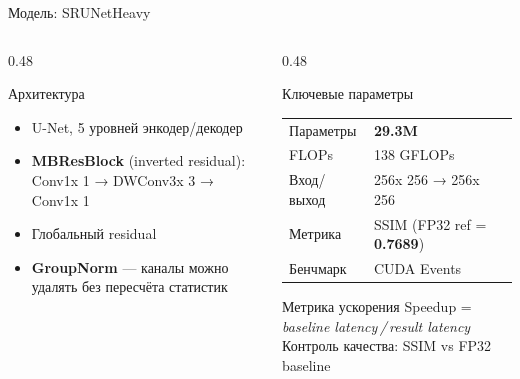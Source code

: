 \documentclass[aspectratio=169,11pt]{beamer}
\begin{document}
\begin{frame}{Модель: SRUNetHeavy}
  \begin{columns}[T]
    \begin{column}{0.48\textwidth}
      \begin{block}{Архитектура}
        \begin{itemize}
          \item U-Net, 5 уровней энкодер/декодер
          \item \textbf{MBResBlock} (inverted residual):\\
                \footnotesize Conv1x 1 → DWConv3x 3 → Conv1x 1
          \item Глобальный residual
          \item \textbf{GroupNorm} — каналы можно удалять без пересчёта статистик
        \end{itemize}
      \end{block}
    \end{column}
    \begin{column}{0.48\textwidth}
      \begin{alertblock}{Ключевые параметры}
        \renewcommand{\arraystretch}{1.15}
        \footnotesize
        \begin{tabular}{@{}ll@{}}
          Параметры  & \textbf{29.3M} \\
          FLOPs      & 138 GFLOPs \\
          Вход/выход & 256x 256 → 256x 256 \\
          Метрика    & SSIM (FP32 ref = \textbf{0.7689}) \\
          Бенчмарк   & CUDA Events\\
        \end{tabular}
      \end{alertblock}
      \vspace{0.4em}
      \begin{exampleblock}{Метрика ускорения}
        Speedup = \textit{baseline latency\,/\,result latency}\\[0.2em]
        Контроль качества: SSIM vs FP32 baseline
      \end{exampleblock}
    \end{column}
  \end{columns}
\end{frame}
\end{document}
